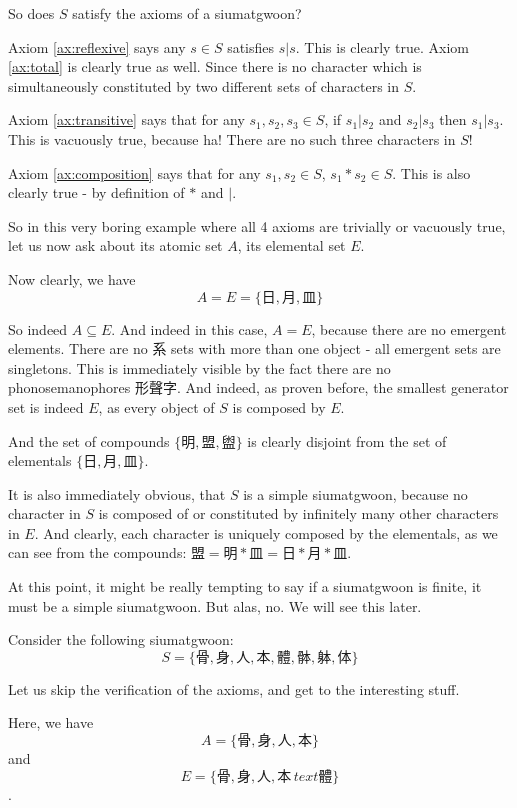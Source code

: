 So does $S$ satisfy the axioms of a siumatgwoon? 

Axiom \ref{ax:reflexive} says any $s\in S$ satisfies $s|s$. This is clearly true. 
Axiom \ref{ax:total} is clearly true as well. Since there is no character which is simultaneously constituted by two different sets of characters in $S$.

Axiom \ref{ax:transitive} says that for any $s_1, s_2, s_3 \in S$, if $s_1|s_2$ and $s_2|s_3$ then $s_1|s_3$. This is vacuously true, because ha! There are no such three characters in $S$! 

Axiom \ref{ax:composition} says that for any $s_1, s_2 \in S$, $s_1*s_2 \in S$. This is also clearly true - by definition of $*$ and $|$.

So in this very boring example where all 4 axioms are trivially or vacuously true, let us now ask about its atomic set $A$, its elemental set $E$.

Now clearly, we have 
$$A=E=\{\text{日},\text{月},\text{皿}\}$$

So indeed $A\subseteq E$. And indeed in this case, $A=E$, because there are no emergent elements. There are no 系 sets with more than one object - all emergent sets are singletons. This is immediately visible by the fact there are no phonosemanophores 形聲字. And indeed, as proven before, the smallest generator set is indeed $E$, as every object of $S$ is composed by $E$.

And the set of compounds $\{\text{明},\text{盟},\text{盥}\}$ is clearly disjoint from the set of elementals $\{\text{日},\text{月},\text{皿}\}$. 

It is also immediately obvious, that $S$ is a simple siumatgwoon, because no character in $S$ is composed of or constituted by infinitely many other characters in $E$. And clearly, each character is uniquely composed by the elementals, as we can see from the compounds: $\text{盟} =\text{明}*\text{皿} = \text{日}*\text{月}*\text{皿}$.


At this point, it might be really tempting to say if a siumatgwoon is finite, it must be a simple siumatgwoon. But alas, no. We will see this later.


Consider the following siumatgwoon: 
$$S=\{\text{骨}, \text{身}, \text{人}, \text{本}, \text{體}, \text{骵}, \text{躰}, \text{体}\}$$

Let us skip the verification of the axioms, and get to the interesting stuff.

Here, we have 
$$A=\{\text{骨}, \text{身}, \text{人}, \text{本}\}$$
and 
$$E=\{\text{骨}, \text{身}, \text{人}, \text{本}\, text{體}\}$$.


